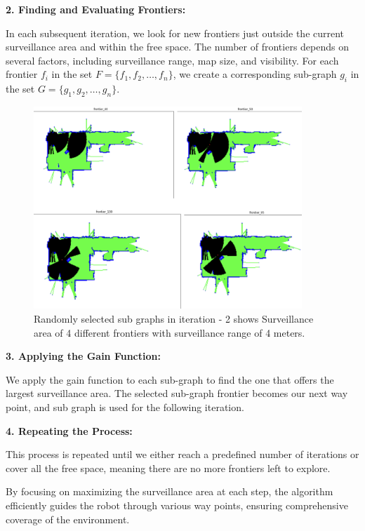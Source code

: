 \textbf{2. Finding and Evaluating Frontiers:}

In each subsequent iteration, we look for new frontiers just outside the current surveillance area and within the free space. The number of frontiers depends on several factors, including surveillance range, map size, and visibility. For each frontier \( f_i \) in the set \( F = \{f_1, f_2, \ldots, f_n\} \), we create a corresponding sub-graph \( g_i \) in the set \( G = \{g_1, g_2, \ldots, g_n\} \).


\begin{figure}[h]
  \centering
  \includegraphics[width=0.9\textwidth, height=0.5\textheight]{Bilder/frontiers.png}
  \caption{Randomly selected sub graphs in iteration - 2 shows  Surveillance area of 4 different frontiers with surveillance range of 4 meters.}
  \label{fig:Frontiers}
\end{figure}


\textbf{3. Applying the Gain Function:}

We apply the gain function to each sub-graph to find the one that offers the largest surveillance area. The selected sub-graph  frontier becomes our next way point, and sub graph is used for the following iteration.

\textbf{4. Repeating the Process:}

This process is repeated until we either reach a predefined number of iterations or cover all the free space, meaning there are no more frontiers left to explore. 

By focusing on maximizing the surveillance area at each step, the algorithm efficiently guides the robot through various way points, ensuring comprehensive coverage of the environment.

